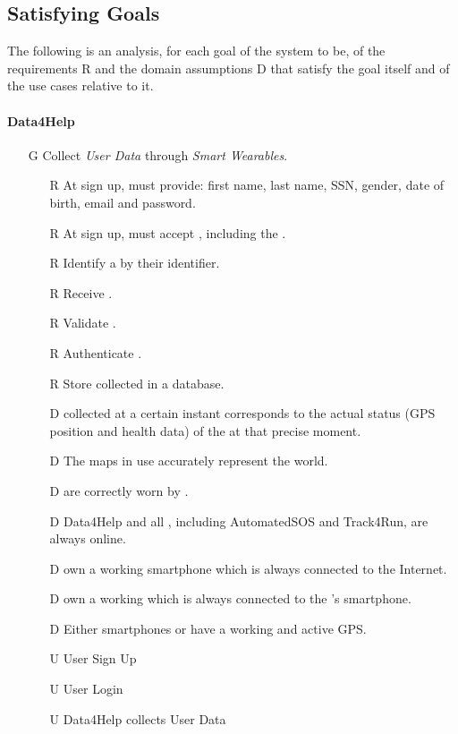 \documentclass[../../../rasd.tex]{subfiles}
\begin{document}
\subsection{Satisfying Goals}
The following is an analysis, for each goal of the system to be, of the requirements R and the domain assumptions D that satisfy the goal itself and of the use cases relative to it.
\paragraph{Data4Help}
\begin{itemize}

	\item[G\subs{1}]Collect \textit{User Data} through \textit{Smart Wearables}.
	\begin{itemize}
		\item[R\subs{2}]At sign up,  must provide: first name, last name, SSN, gender, date of birth, email and password.
		\item[R\subs{4}]At sign up,  must accept , including the .
		\item[R\subs{6}]Identify a  by their identifier.
		\item[R\subs{8}]Receive .
		\item[R\subs{9}]Validate .
		\item[R\subs{10}]Authenticate .
		\item[R\subs{11}]Store collected  in a database.
		\\
		\item[D\subs{2}] collected at a certain instant corresponds to the actual status (GPS position and health data) of the  at that precise moment.              
		\item[D\subs{3}]The maps in use accurately represent the world.
		\item[D\subs{8}] are correctly worn by .
		\item[D\subs{9}]Data4Help and all , including AutomatedSOS and Track4Run, are always online.
		\item[D\subs{10}] own a working smartphone which is always connected to the Internet.
		\item[D\subs{11}] own a working  which is always connected to the 's smartphone.
		\item[D\subs{12}]Either smartphones or  have a working and active GPS.
		\\
		\item[U\subs{1}]User Sign Up
		\item[U\subs{3}]User Login
		\item[U\subs{5}]Data4Help collects User Data


\end{itemize}
\end{itemize}
\end{document}
